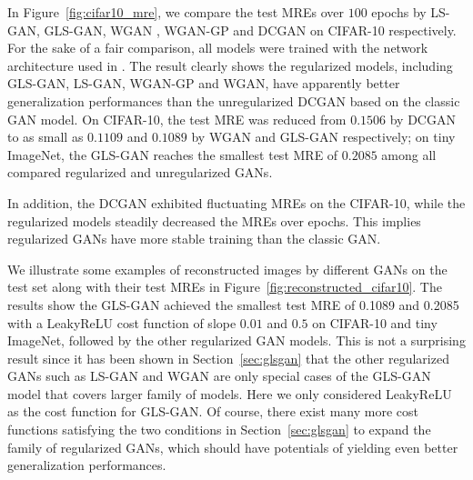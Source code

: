 \documentclass[11pt,fullpage, letterpaper,twoside]{article}
\newcommand{\1}[1]{\mathds{1}_{\left[#1\right]}}
\begin{document}
In Figure~\ref{fig:cifar10_mre}, we compare the test MREs over $100$ epochs by LS-GAN, GLS-GAN, WGAN \cite{wgan17}, WGAN-GP \cite{gulrajani2017improved} and DCGAN \cite{radford2015unsupervised} on CIFAR-10 respectively.
For the sake of a fair comparison, all models were trained with the network architecture used in \cite{radford2015unsupervised}.
The result clearly shows the regularized models, including GLS-GAN, LS-GAN, WGAN-GP and WGAN, have apparently better generalization performances than the unregularized DCGAN based on the classic GAN model. On CIFAR-10, the test MRE was reduced from $0.1506$ by DCGAN to as small as $0.1109$ and $0.1089$ by WGAN and GLS-GAN respectively; on tiny ImageNet, the GLS-GAN reaches the smallest test MRE of $0.2085$ among all compared regularized and unregularized GANs.



In addition, the DCGAN exhibited fluctuating MREs on the CIFAR-10, while the regularized models steadily decreased the MREs over epochs. This implies regularized GANs have more stable training than the classic GAN. 






We illustrate some examples of reconstructed images by different GANs on the test set along with their test MREs in Figure~\ref{fig:reconstructed_cifar10}.
The results show the GLS-GAN achieved the smallest test MRE of 0.1089 and 0.2085 with a LeakyReLU cost function of slope $0.01$ and $0.5$ on CIFAR-10 and tiny ImageNet, followed by the other regularized GAN models.
This is not a surprising result since it has been shown in Section~\ref{sec:glsgan} that the other regularized GANs such as LS-GAN and WGAN are only special cases of the GLS-GAN model that covers larger family of models. Here we only considered LeakyReLU as the cost function for GLS-GAN. Of course, there exist many more cost functions satisfying the two conditions in Section~\ref{sec:glsgan}  to expand the family of regularized GANs, which should have potentials of yielding even better generalization performances.
\end{document}
